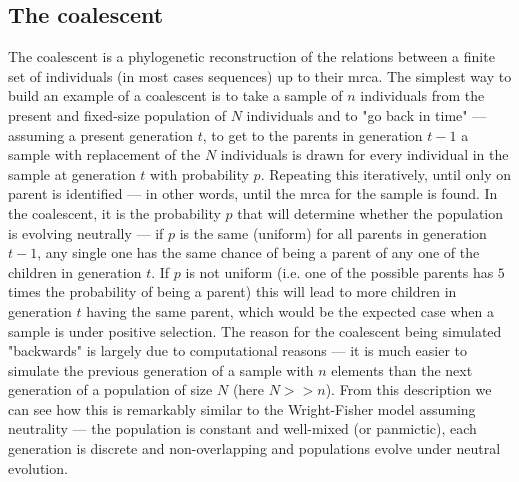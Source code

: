 \subsection{The coalescent}

The coalescent is a phylogenetic reconstruction of the relations between a finite set of individuals (in most cases sequences) up to their \ac{mrca}. The simplest way to build an example of a coalescent is to take a sample of $n$ individuals from the present and fixed-size population of $N$ individuals and to "go back in time" --- assuming a present generation $t$, to get to the parents in generation $t-1$ a sample with replacement of the $N$ individuals is drawn for every individual in the sample at generation $t$ with probability $p$. Repeating this iteratively, until only on parent is identified --- in other words, until the \ac{mrca} for the sample is found. In the coalescent, it is the probability $p$ that will determine whether the population is evolving neutrally --- if $p$ is the same (uniform) for all parents in generation $t-1$, any single one has the same chance of being a parent of any one of the children in generation $t$. If $p$ is not uniform (i.e. one of the possible parents has $5$ times the probability of being a parent) this will lead to more children in generation $t$ having the same parent, which would be the expected case when a sample is under positive selection. The reason for the coalescent being simulated "backwards" is largely due to computational reasons --- it is much easier to simulate the previous generation of a sample with $n$ elements than the next generation of a population of size $N$ (here $N>>n$). From this description we can see how this is remarkably similar to the Wright-Fisher model assuming neutrality --- the population is constant and well-mixed (or panmictic), each generation is discrete and non-overlapping and populations evolve under neutral evolution. 


